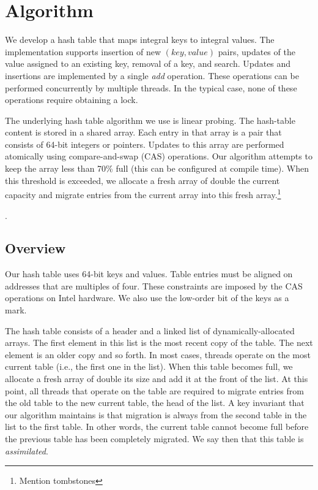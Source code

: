 \section{Algorithm}
\label{sec:algo}

We develop a hash table that maps integral keys to integral
values. The implementation supports insertion of new $(key,value)$
pairs, updates of the value assigned to an existing key, removal of a
key, and search. Updates and insertions are implemented by a single
{\em add\/} operation. These operations can be performed concurrently
by multiple threads. In the typical case, none of these operations
require obtaining a lock.

The underlying hash table algorithm we use is linear probing. The
hash-table content is stored in a shared array. Each entry in that
array is a pair that consists of 64-bit integers or pointers. Updates
to this array are performed atomically using compare-and-swap (CAS)
operations. Our algorithm attempts to keep the array less than 70\%
full (this can be configured at compile time). When this threshold is
exceeded, we allocate a fresh array of double the current capacity and
migrate entries from the current array into this fresh array.\footnote{Mention tombstones}

.

\subsection{Overview}

Our hash table uses 64-bit keys and values. Table entries must be
aligned on addresses that are multiples of four. These constraints are
imposed by the CAS operations on Intel hardware. We also use the low-order
bit of the keys as a mark.

The hash table consists of a header and a linked list of
dynamically-allocated arrays.  The first element in this list is the
most recent copy of the table. The next element is an older copy and
so forth.  In most cases, threads operate on the most current table
(i.e., the first one in the list). When this table becomes full, we
allocate a fresh array of double its size and add it at the front of
the list.  At this point, all threads that operate on the table are
required to migrate entries from the old table to the new current
table, the head of the list. A key invariant that our algorithm
maintains is that migration is always from the second table in the
list to the first table. In other words, the current table cannot
become full before the previous table has been completely migrated.
We say then that this table is {\em assimilated\/}.


